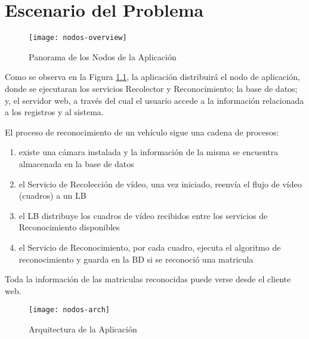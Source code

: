 \chapter{Escenario del Problema}
    \begin{figure}[H]
            \centering
            \texttt{[image: nodos-overview]}
            \caption{Panorama de los Nodos de la Aplicación}
            \label{fig:nodos-overview}
    \end{figure}
    
    Como se observa en la Figura \ref{fig:nodos-overview}, la aplicación distribuirá el nodo de aplicación, donde se ejecutaran los servicios Recolector y Reconocimiento; la base de datos; y, el servidor web, a través del cual el usuario accede a la información relacionada a los registros y al sistema.
        
        El proceso de reconocimiento de un vehículo sigue una cadena de procesos:

        \begin{enumerate}
            \item existe una cámara instalada y la información de la misma se encuentra almacenada en la base de datos
            \item el Servicio de Recolección de vídeo, una vez iniciado, reenvía el flujo de vídeo (cuadros) a un LB
            \item el LB distribuye los cuadros de vídeo recibidos entre los servicios de Reconocimiento disponibles
            \item el Servicio de Reconocimiento, por cada cuadro, ejecuta el algoritmo de reconocimiento y guarda en la BD si se reconoció una matricula
        \end{enumerate}    
        
        Toda la información de las matriculas reconocidas puede verse desde el cliente web.
        
         \begin{figure}[H]
            \centering
            \texttt{[image: nodos-arch]}
            \caption{Arquitectura de la Aplicación}
            \label{fig:nodos-arch}
        \end{figure} 
        
